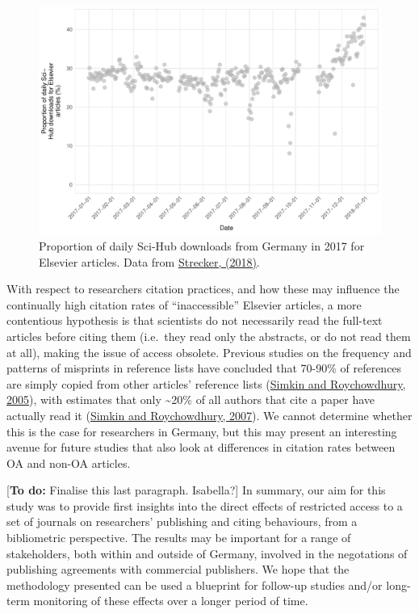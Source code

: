 \documentclass[
]{article}
\begin{document}
\begin{figure}

{\centering \includegraphics[width=0.75\linewidth]{analysis_files/figure-latex/scihub-germany-1} 

}

\caption{Proportion of daily Sci-Hub downloads from Germany in 2017 for Elsevier articles. Data from \href{http://doi.org/10.5281/zenodo.1286284}{Strecker, (2018)}.}\label{fig:scihub-germany}
\end{figure}

With respect to researchers citation practices, and how these may influence the continually high citation rates of ``inaccessible'' Elsevier articles, a more contentious hypothesis is that scientists do not necessarily read the full-text articles before citing them (i.e.~they read only the abstracts, or do not read them at all), making the issue of access obsolete. Previous studies on the frequency and patterns of misprints in reference lists have concluded that 70-90\% of references are simply copied from other articles' reference lists (\href{https://doi.org/10.1007/s11192-005-0028-2}{Simkin and Roychowdhury, 2005}), with estimates that only \textasciitilde20\% of all authors that cite a paper have actually read it (\href{https://doi.org/10.1002/asi.20653}{Simkin and Roychowdhury, 2007}). We cannot determine whether this is the case for researchers in Germany, but this may present an interesting avenue for future studies that also look at differences in citation rates between OA and non-OA articles.

{[}\textbf{To do:} Finalise this last paragraph. Isabella?{]} In summary, our aim for this study was to provide first insights into the direct effects of restricted access to a set of journals on researchers' publishing and citing behaviours, from a bibliometric perspective. The results may be important for a range of stakeholders, both within and outside of Germany, involved in the negotations of publishing agreements with commercial publishers. We hope that the methodology presented can be used a blueprint for follow-up studies and/or long-term monitoring of these effects over a longer period of time.
\end{document}
